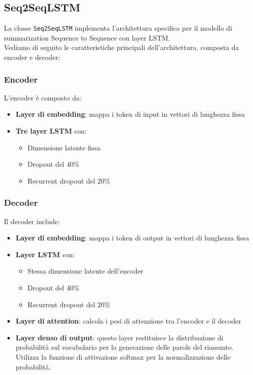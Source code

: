 \subsection{Seq2SeqLSTM}
La classe \texttt{Seq2SeqLSTM} implementa l'architettura specifica per il modello di summarization Sequence to Sequence con layer LSTM.\\
Vediamo di seguito le caratteristiche principali dell'architettura, composta da encoder e decoder:

\subsubsection{Encoder}
L'encoder è composto da:
\begin{itemize}
    \item \textbf{Layer di embedding}: mappa i token di input in vettori di lunghezza fissa
    \item \textbf{Tre layer LSTM} con:
        \begin{itemize}
            \item Dimensione latente fissa
            \item Dropout del 40\% 
            \item Recurrent dropout del 20\% 
        \end{itemize}
\end{itemize}

\subsubsection{Decoder}
Il decoder include:
\begin{itemize}
    \item \textbf{Layer di embedding}: mappa i token di output in vettori di lunghezza fissa
    \item \textbf{Layer LSTM} con:
        \begin{itemize}
            \item Stessa dimensione latente dell'encoder
            \item Dropout del 40\%
            \item Recurrent dropout del 20\%
        \end{itemize}
    \item \textbf{Layer di attention}: calcola i pesi di attenzione tra l'encoder e il decoder
    \item \textbf{Layer denso di output}: questo layer restituisce la distribuzione di probabilità sul vocabolario per la generazione delle parole del riassunto.\\ 
    Utilizza la funzione di attivazione softmax per la normalizzazione delle probabilità.
\end{itemize}

